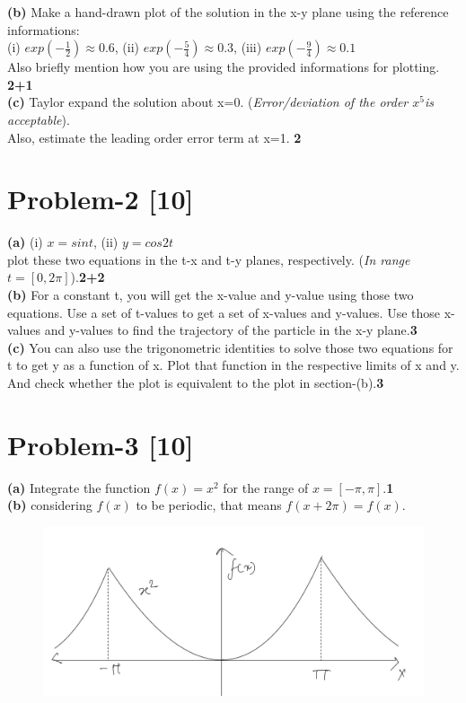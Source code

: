 \documentclass[12pt, a4paper]{article}
\begin{document}
\textbf{(b)} Make a hand-drawn plot of the solution in the x-y plane using the reference informations:\\
(i) $exp(-\frac{1}{2})\approx 0.6$, (ii) $exp(-\frac{5}{4})\approx 0.3$, (iii) $exp(-\frac{9}{4})\approx 0.1$\\
Also briefly mention how you are using the provided informations for plotting. \hfill\textbf{2+1}\\

\textbf{(c)} Taylor expand the solution about x=0. (\textit{Error/deviation of the order $x^5$is acceptable}).\\
Also, estimate the leading order error term at x=1. \hfill \textbf{2}

\section*{Problem-2 \hfill \textbf{[10]}}
\textbf{(a)} (i) $x=sint$, (ii) $y=cos2t$\\ 
plot these two equations in the t-x and t-y planes, respectively. (\textit{In range $t=[0, 2\pi]$}).\hfill \textbf{2+2}\\
\textbf{(b)} For a constant t, you will get the x-value and y-value using those two equations.
Use a set of t-values to get a set of x-values and y-values. 
Use those x-values and y-values to find the trajectory of the particle in the x-y plane.\hfill\textbf{3}\\
\textbf{(c)} You can also use the trigonometric identities to solve those two equations for t 
to get y as a function of x. Plot that function in the respective limits of x and y.
And check whether the plot is equivalent to the plot in section-(b).\hfill\textbf{3}

\section*{Problem-3 \hfill \textbf{[10]}}
\textbf{(a)} Integrate the function $f(x) = x^2$ for the range of $x=[-\pi, \pi]$.\hfill\textbf{1}\\
\textbf{(b)} considering $f(x)$ to be periodic, that means $f(x + 2\pi) = f(x)$.
\begin{figure}[h]
    \centering
    \includegraphics[scale=.25]{figs/a0-p3-x^2fourier.jpeg}
\end{figure}
\end{document}
